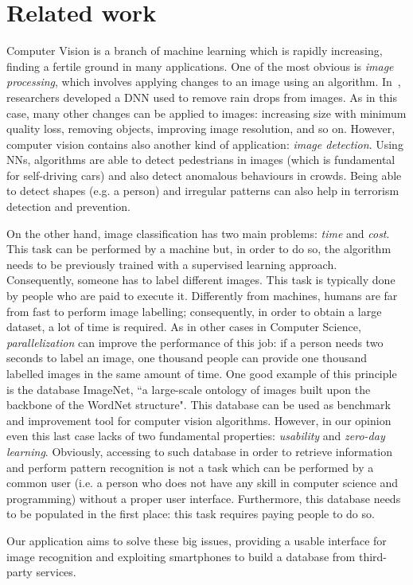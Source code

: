 \section{Related work}
\label{sec:related}

Computer Vision is a branch of machine learning which is rapidly increasing, 
finding a fertile ground in many applications. One of the most obvious is 
\textit{image processing}, which involves applying changes to an image using an 
algorithm. In~\cite{Rain}, researchers developed a DNN used to remove rain 
drops from images. As in this case, many other changes can be applied to 
images: increasing size with minimum quality loss, removing objects, improving 
image resolution, and so on. However, computer vision contains also another kind 
of application: \textit{image detection}. Using NNs, algorithms are able to 
detect pedestrians in images\cite{Pedestrian} (which is fundamental for 
self-driving cars) and also detect anomalous behaviours in crowds\cite{Crowd}. 
Being able to detect shapes (e.g. a person) and irregular patterns can also 
help in terrorism detection and prevention.

On the other hand, image classification has two main problems: \textit{time} 
and \textit{cost}. This task can be performed by a machine but, in order to do 
so, the algorithm needs to be previously trained with a supervised learning 
approach. Consequently, someone has to label different images. This task is 
typically done by people who are paid to execute it. Differently from machines, 
humans are far from fast to perform image labelling; consequently, in order to 
obtain a large dataset, a lot of time is required.
As in other cases in Computer Science, \textit{parallelization} can improve the 
performance of this job: if a person needs two seconds to label an image, one 
thousand people can provide one thousand labelled images in the same amount of 
time. One good example of this principle is the database 
ImageNet\cite{ImageNet2}, ``a large-scale ontology of images built upon the 
backbone of the WordNet structure"\cite{ImageNet1}. This database can be used 
as benchmark and improvement tool for computer vision algorithms.
However, in our opinion even this last case lacks of two fundamental 
properties: \textit{usability} and \textit{zero-day learning}. Obviously, 
accessing to such database in order to retrieve information and perform pattern 
recognition is not a task which can be performed by a common user (i.e. a 
person who does not have any skill in computer science and programming) without 
a proper user interface. Furthermore, this database needs to be populated in the 
first place: this task requires paying people to do so.

Our application aims to solve these big issues, providing a usable interface 
for image recognition and exploiting smartphones to build a database from 
third-party services.
